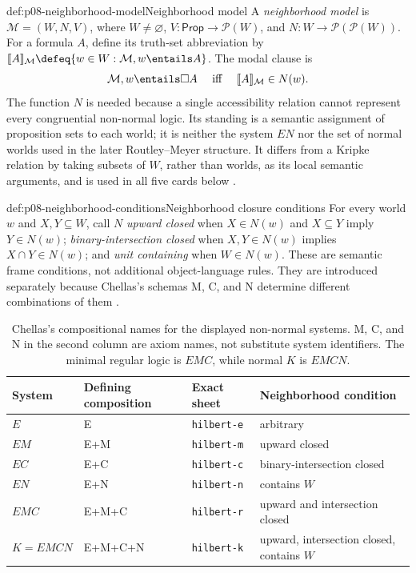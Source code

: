 \begin{hbdefinition}{def:p08-neighborhood-model}{Neighborhood model}
A \emph{neighborhood model} is
\(\mathcal M=(W,N,V)\), where \(W\ne\varnothing\),
\(V:\mathsf{Prop}\to\mathcal P(W)\), and
\(N:W\to\mathcal P(\mathcal P(W))\).  For a formula \(A\), define
its truth-set abbreviation by
\(\lbrack\!\lbrack A\rbrack\!\rbrack_{\mathcal M}
\defeq\{w\in W:\mathcal M,w\entails A\}\).  The modal clause is
\[
 \mathcal M,w\entails\Box A
 \quad\text{ iff }\quad
 \lbrack\!\lbrack A\rbrack\!\rbrack_{\mathcal M}\in N(w).
\]
The function \(N\) is needed because a single accessibility relation
cannot represent every congruential non-normal logic.  Its standing is a
semantic assignment of proposition sets to each world; it is neither the
system \(EN\) nor the set of normal worlds used in the later
Routley--Meyer structure.  It differs from a Kripke
relation by taking subsets of \(W\), rather than worlds, as its local semantic
arguments, and is used in all five cards below
\cite{Scott1970,Montague1970,Chellas1980,Pacuit2017}.
\end{hbdefinition}

\begin{hbdefinition}{def:p08-neighborhood-conditions}{Neighborhood closure conditions}
For every world \(w\) and \(X,Y\subseteq W\), call \(N\)
\emph{upward closed} when
\(X\in N(w)\) and \(X\subseteq Y\) imply
\(Y\in N(w)\); \emph{binary-intersection closed} when
\(X,Y\in N(w)\) implies
\(X\cap Y\in N(w)\); and \emph{unit containing} when
\(W\in N(w)\).  These are semantic frame conditions, not additional
object-language rules.  They are introduced separately because Chellas's
schemas M, C, and N determine different combinations of them
\cite{Chellas1980,Pacuit2017}.
\end{hbdefinition}

\begin{table}[!htbp]
\centering
\small
\begin{tabular}{@{}p{}p{}p{}p{}@{}}
\toprule
System & Defining composition & Exact sheet & Neighborhood condition \\
\midrule
\(E\) & E & \texttt{hilbert-e} & arbitrary \\
\(EM\) & E+M & \texttt{hilbert-m} & upward closed \\
\(EC\) & E+C & \texttt{hilbert-c} & binary-intersection closed \\
\(EN\) & E+N & \texttt{hilbert-n} & contains \(W\) \\
\(EMC\) & E+M+C & \texttt{hilbert-r} & upward and intersection closed \\
\(K=EMCN\) & E+M+C+N & \texttt{hilbert-k} & upward, intersection closed, contains \(W\) \\
\bottomrule
\end{tabular}
\caption{Chellas's compositional names for the displayed non-normal systems.
M, C, and N in the second column are axiom names, not substitute system
identifiers.  The minimal regular logic is \(EMC\), while normal \(K\) is
\(EMCN\).}
\label{tab:p08-neighborhood-systems}
\end{table}

